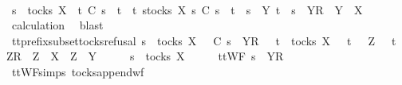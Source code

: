 \ \ \ \ \isamarkupfalse%
\isanewline
\ \ \isamarkupfalse%
\ \isamarkupfalse%
\ {\isachardoublequoteopen}s\ {\isasymin}\ tocks\ X\ {\isasymLongrightarrow}\ t\ {\isasymlesssim}\isactrlsub C\ s\ {\isasymLongrightarrow}\ t\ {\isasymin}\ {\isacharbraceleft}t{\isachardot}\ {\isasymexists}s{\isacharprime}{\isasymin}tocks\ X{\isachardot}\ s{\isacharprime}\ {\isasymlesssim}\isactrlsub C\ s\ {\isasymand}\ {\isacharparenleft}t\ {\isacharequal}\ s{\isacharprime}\ {\isasymor}\ {\isacharparenleft}{\isasymexists}Y{\isachardot}\ t\ {\isacharequal}\ s{\isacharprime}\ {\isacharat}\ {\isacharbrackleft}{\isacharbrackleft}Y{\isacharbrackright}\isactrlsub R{\isacharbrackright}\ {\isasymand}\ Y\ {\isasymsubseteq}\ X{\isacharparenright}{\isacharparenright}{\isacharbraceright}{\isachardoublequoteclose}\isanewline
\ \ \ \ \isamarkupfalse%
\ calculation\ \isamarkupfalse%
\ blast\isanewline
{}\isamarkupfalse%
%
\endisatagproof
{\isafoldproof}%
%
\isadelimproof
\isanewline
%
\endisadelimproof
\isanewline
{}\isamarkupfalse%
\ tt{\isacharunderscore}prefix{\isacharunderscore}subset{\isacharunderscore}tocks{\isacharunderscore}refusal{\isacharcolon}\ {\isachardoublequoteopen}s\ {\isasymin}\ tocks\ X\ {\isasymLongrightarrow}\ {\isasymrho}\ {\isasymlesssim}\isactrlsub C\ s\ {\isacharat}\ {\isacharbrackleft}{\isacharbrackleft}Y{\isacharbrackright}\isactrlsub R{\isacharbrackright}\ {\isasymLongrightarrow}\ {\isacharparenleft}{\isasymexists}\ t\ {\isasymin}\ tocks\ X{\isachardot}\ {\isasymrho}\ {\isacharequal}\ t\ {\isasymor}\ {\isacharparenleft}{\isasymexists}\ Z{\isachardot}\ {\isasymrho}\ {\isacharequal}\ t\ {\isacharat}\ {\isacharbrackleft}{\isacharbrackleft}Z{\isacharbrackright}\isactrlsub R{\isacharbrackright}\ {\isasymand}\ {\isacharparenleft}Z\ {\isasymsubseteq}\ X\ {\isasymor}\ Z\ {\isasymsubseteq}\ Y{\isacharparenright}{\isacharparenright}{\isacharparenright}{\isachardoublequoteclose}\isanewline
%
\isadelimproof
%
\endisadelimproof
%
\isatagproof
{}\isamarkupfalse%
\ {\isacharminus}\isanewline
\ \ \isamarkupfalse%
\ {\isachardoublequoteopen}s\ {\isasymin}\ tocks\ X{\isachardoublequoteclose}\isanewline
\ \ \isamarkupfalse%
\ \isamarkupfalse%
\ {\isachardoublequoteopen}ttWF\ {\isacharparenleft}s\ {\isacharat}\ {\isacharbrackleft}{\isacharbrackleft}Y{\isacharbrackright}\isactrlsub R{\isacharbrackright}{\isacharparenright}{\isachardoublequoteclose}\isanewline
\ \ \ \ \isamarkupfalse%
\ ttWF{\isachardot}simps{\isacharparenleft}{}{\isacharparenright}\ tocks{\isacharunderscore}append{\isacharunderscore}wf\ \isamarkupfalse%
